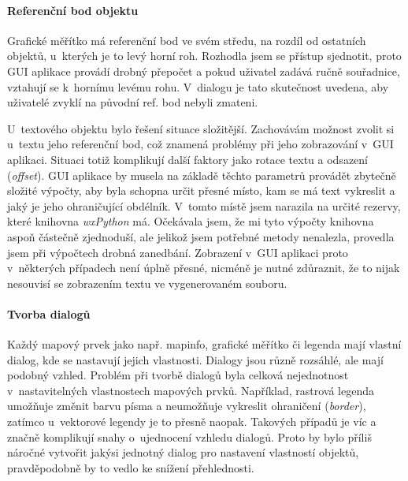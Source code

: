 \documentclass[a4paper,12pt,draft]{article}
\newif\ifbc %
\begin{document}
 \paragraph*{Referenční bod objektu}
 Grafické měřítko má referenční bod ve svém středu, na rozdíl
 od ostatních objektů, u~kterých je to levý horní roh\ifbc, viz
 \ref{sec:psmap:referencepoint}\fi. Rozhodla jsem se přístup sjednotit,
 proto GUI aplikace provádí drobný přepočet a pokud uživatel zadává
 ručně souřadnice, vztahují se k~hornímu levému rohu. V~dialogu je
 tato skutečnost uvedena, aby uživatelé zvyklí na původní ref. bod
 nebyli zmateni.

 U~textového objektu bylo řešení situace složitější. Zachovávám
 možnost zvolit si u~textu jeho referenční bod, což znamená problémy
 při jeho zobrazování v~GUI aplikaci. Situaci totiž komplikují další
 faktory jako rotace textu a odsazení (\emph{offset}).
 GUI aplikace by musela na základě těchto parametrů provádět zbytečně
 složité výpočty, aby byla schopna určit přesné místo, kam se
 má text vykreslit a jaký je jeho ohraničující obdélník. V~tomto
 místě jsem narazila na určité rezervy, které knihovna \emph{wxPython}
 má. Očekávala jsem, že mi tyto výpočty knihovna aspoň částečně
 zjednoduší, ale jelikož jsem potřebné metody nenalezla, provedla
 jsem při výpočtech drobná zanedbání. Zobrazení v~GUI aplikaci proto
 v~některých případech není úplně přesné, nicméně je nutné
 zdůraznit, že to nijak nesouvisí se zobrazením textu ve  vygenerovaném
 souboru.

 \paragraph*{Tvorba dialogů}
 Každý mapový prvek jako např. mapinfo, grafické měřítko či legenda
 mají vlastní dialog, kde se nastavují jejich vlastnosti. Dialogy jsou
 různě rozsáhlé, ale mají podobný vzhled. Problém při tvorbě
 dialogů byla celková nejednotnost v~nastavitelných vlastnostech
 mapových prvků. Například, rastrová legenda umožňuje změnit barvu písma a
 neumožňuje vykreslit ohraničení (\emph{border}), zatímco u~vektorové
 legendy je to přesně naopak. Takových případů je víc a značně
 komplikují snahy o~ujednocení vzhledu dialogů. Proto by bylo příliš
 náročné vytvořit jakýsi jednotný dialog pro nastavení vlastností
 objektů, pravděpodobně by to vedlo ke snížení přehlednosti.
\end{document}
